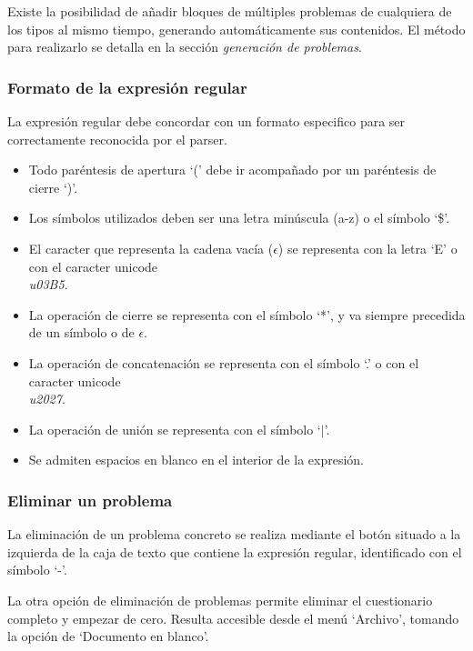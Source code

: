 
Existe la posibilidad de añadir bloques de múltiples problemas de cualquiera de los tipos al mismo tiempo, generando automáticamente sus contenidos.
El método para realizarlo se detalla en la sección \emph{generación de problemas}.

\subsubsection{Formato de la expresión regular}
La expresión regular debe concordar con un formato especifico para ser correctamente reconocida por el parser.
\begin{itemize}
	\item Todo paréntesis de apertura `(' debe ir acompañado por un paréntesis de cierre `)'.
	\item Los símbolos utilizados deben ser una letra minúscula (a-z) o el símbolo `\$'.
	\item El caracter que representa la cadena vacía ($ \epsilon $) se representa con la letra `E' o con el caracter unicode \emph{\\u03B5}.
	\item La operación de cierre se representa con el símbolo `*', y va siempre precedida de un símbolo o de $ \epsilon $.
	\item La operación de concatenación se representa con el símbolo `.' o con el caracter unicode \emph{\\u2027}.
	\item La operación de unión se representa con el símbolo `$ | $'.
	\item Se admiten espacios en blanco en el interior de la expresión.
\end{itemize}

\subsubsection{Eliminar un problema}
La eliminación de un problema concreto se realiza mediante el botón situado a la izquierda de la caja de texto que contiene la expresión regular, identificado con el símbolo `-'.


La otra opción de eliminación de problemas permite eliminar el cuestionario completo y empezar de cero.
Resulta accesible desde el menú `Archivo', tomando la opción de `Documento en blanco'.

